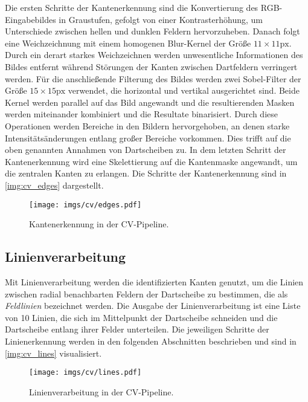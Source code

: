Die ersten Schritte der Kantenerkennung sind die Konvertierung des RGB-Eingabebildes in Graustufen, gefolgt von einer Kontrasterhöhung, um Unterschiede zwischen hellen und dunklen Feldern hervorzuheben. Danach folgt eine Weichzeichnung mit einem homogenen Blur-Kernel der Größe $11\times11\text{px}$. Durch ein derart starkes Weichzeichnen werden unwesentliche Informationen des Bildes entfernt während Störungen der Kanten zwischen Dartfeldern verringert werden. Für die anschließende Filterung des Bildes werden zwei Sobel-Filter der Größe $15\times15\text{px}$ verwendet, die horizontal und vertikal ausgerichtet sind. Beide Kernel werden parallel auf das Bild angewandt und die resultierenden Masken werden miteinander kombiniert und die Resultate binarisiert. Durch diese Operationen werden Bereiche in den Bildern hervorgehoben, an denen starke Intensitätsänderungen entlang großer Bereiche vorkommen. Dies trifft auf die oben genannten Annahmen von Dartscheiben zu. In dem letzten Schritt der Kantenerkennung wird eine Skelettierung auf die Kantenmaske angewandt, um die zentralen Kanten zu erlangen. Die Schritte der Kantenerkennung sind in \autoref{img:cv_edges} dargestellt.

\begin{figure}
    \centering
    \texttt{[image: imgs/cv/edges.pdf]}
    \caption{Kantenerkennung in der CV-Pipeline.}
    \label{img:cv_edges}
\end{figure}

\subsection{Linienverarbeitung}
\label{sec:impl:cv:lines}

Mit Linienverarbeitung werden die identifizierten Kanten genutzt, um die Linien zwischen radial benachbarten Feldern der Dartscheibe zu bestimmen, die als \textit{Feldlinien} bezeichnet werden. Die Ausgabe der Linienverarbeitung ist eine Liste von 10 Linien, die sich im Mittelpunkt der Dartscheibe schneiden und die Dartscheibe entlang ihrer Felder unterteilen. Die jeweiligen Schritte der Linienerkennung werden in den folgenden Abschnitten beschrieben und sind in \autoref{img:cv_lines} visualisiert.

\begin{figure}
    \centering
    \texttt{[image: imgs/cv/lines.pdf]}
    \caption{Linienverarbeitung in der CV-Pipeline.}
    \label{img:cv_lines}
\end{figure}

